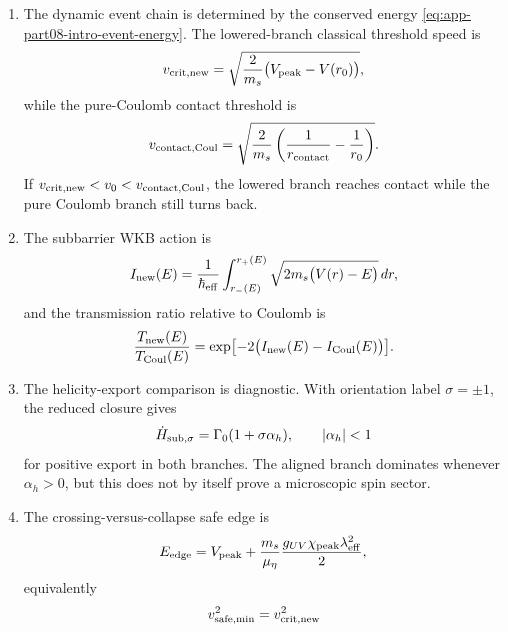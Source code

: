 \begin{theorem}
\begin{enumerate}[leftmargin=2.2em]
  \item The dynamic event chain is determined by the conserved energy \cref{eq:app-part08-intro-event-energy}.  The lowered-branch classical threshold speed is
  \begin{equation}
  \label{eq:app-part08-main-vcrit-new}
  v_{\rm crit,new}=\sqrt{\frac{2}{m_s}\bigl(V_{\rm peak}-V(r_0)\bigr)},
  \end{equation}
  while the pure-Coulomb contact threshold is
  \begin{equation}
  \label{eq:app-part08-main-vcrit-coul}
  v_{\rm contact,Coul}
  =
  \sqrt{\frac{2}{m_s}\left(\frac1{r_{\rm contact}}-\frac1{r_0}\right)}.
  \end{equation}
  If \(v_{\rm crit,new}<v_0<v_{\rm contact,Coul}\), the lowered branch reaches contact while the pure Coulomb branch still turns back.
  \item The subbarrier WKB action is
  \begin{equation}
  \label{eq:app-part08-main-wkb-action}
  I_{\rm new}(E)=
  \frac{1}{\hbar_{\rm eff}}
  \int_{r_-(E)}^{r_+(E)}
  \sqrt{2m_s\bigl(V(r)-E\bigr)}\,dr,
  \end{equation}
  and the transmission ratio relative to Coulomb is
  \begin{equation}
  \label{eq:app-part08-main-transmission-ratio}
  \frac{T_{\rm new}(E)}{T_{\rm Coul}(E)}
  =
  \exp\bigl[-2\bigl(I_{\rm new}(E)-I_{\rm Coul}(E)\bigr)\bigr].
  \end{equation}
  \item The helicity-export comparison is diagnostic.  With orientation label \(\sigma=\pm1\), the reduced closure gives
  \begin{equation}
  \label{eq:app-part08-main-helicity-rate}
  \dot H_{{\rm sub},\sigma}=\Gamma_0(1+\sigma\alpha_h),
  \qquad
  |\alpha_h|<1
  \end{equation}
  for positive export in both branches.  The aligned branch dominates whenever \(\alpha_h>0\), but this does not by itself prove a microscopic spin sector.
  \item The crossing-versus-collapse safe edge is
  \begin{equation}
  \label{eq:app-part08-main-goldilocks-edge}
  E_{\rm edge}=V_{\rm peak}
  +
  \frac{m_s}{\mu_\eta}
  \frac{g_{UV}\chi_{\rm peak}\lambda_{\rm eff}^{2}}{2},
  \end{equation}
  equivalently
  \begin{equation}
  \label{eq:app-part08-main-goldilocks-speed}
  v_{\rm safe,min}^{2}
  =
  v_{\rm crit,new}^{2}

\end{equation}
\end{enumerate}
\end{theorem}
